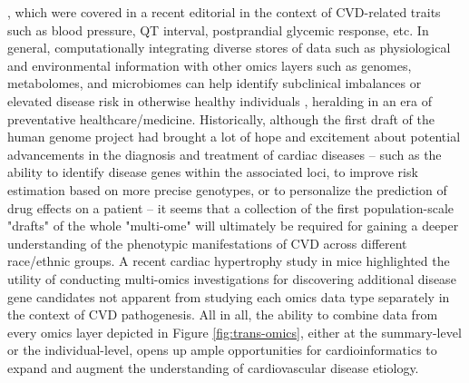 \documentclass[letter]{bioinfo}
\begin{document}
\citep{Zeevi:2015:Personalized}, which were covered in a recent editorial \cite{Lau:2018:Omics} in the context of CVD-related traits such as blood pressure, QT interval, postprandial glycemic response, etc.  In general, computationally integrating diverse stores of data such as physiological and environmental information with other omics layers such as genomes, metabolomes, and microbiomes can help identify subclinical imbalances or elevated disease risk in otherwise healthy individuals \cite{Lau:2018:Omics}, heralding in an era of preventative healthcare/medicine.  Historically, although the first draft of the human genome project had brought a lot of hope and excitement about potential advancements in the diagnosis and treatment of cardiac diseases -- such as the ability to identify disease genes within the associated loci, to improve risk estimation based on more precise genotypes, or to personalize the prediction of drug effects on a patient \citep{Komajda:2001:heart} -- it seems that a collection of the first population-scale "drafts" of the whole "multi-ome" will ultimately be required for gaining a deeper understanding of the phenotypic manifestations of CVD across different race/ethnic groups.  A recent cardiac hypertrophy study in mice \citep{Lau:2018:integrated} highlighted the utility of conducting multi-omics investigations for discovering additional disease gene candidates not apparent from studying each omics data type separately in the context of CVD pathogenesis.  All in all, the ability to combine data from every omics layer depicted in Figure \ref{fig:trans-omics}, either at the summary-level or the individual-level, opens up ample opportunities for cardioinformatics to expand and augment the understanding of cardiovascular disease etiology.
	
	
\end{document}
